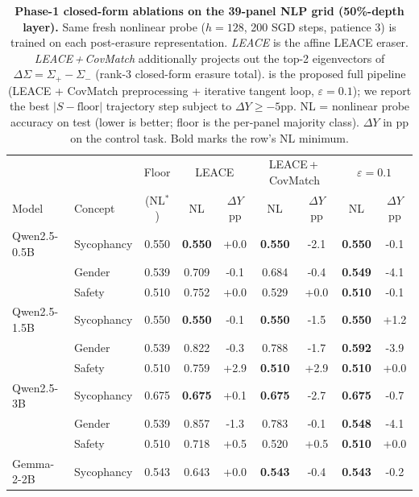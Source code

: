\begin{table}[t]
\centering
\small
\caption{\textbf{Phase-1 closed-form ablations on the 39-panel NLP grid (50\%-depth layer).} Same fresh nonlinear probe ($h=128$, 200 SGD steps, patience 3) is trained on each post-erasure representation. \emph{LEACE} is the affine LEACE eraser. \emph{LEACE\,+\,CovMatch} additionally projects out the top-2 eigenvectors of $\Delta\Sigma = \Sigma_{+} - \Sigma_{-}$ (rank-3 closed-form erasure total). \emph{\TanGCEpp{}} is the proposed full pipeline (LEACE + CovMatch preprocessing + iterative tangent loop, $\varepsilon{=}0.1$); we report the best $|S{-}\text{floor}|$ trajectory step subject to $\Delta Y \geq -5$pp. NL = nonlinear probe accuracy on test (lower is better; floor is the per-panel majority class). $\Delta Y$ in pp on the control task. Bold marks the row's NL minimum.}
\label{tab:leace_vs_tangce_nlp}
\begin{tabular}{l l c | c c | c c | c c}
\toprule
 &  & Floor & \multicolumn{2}{c|}{LEACE} & \multicolumn{2}{c|}{LEACE\,+\,CovMatch} & \multicolumn{2}{c}{\TanGCEpp{} $\varepsilon{=}0.1$} \\
Model & Concept & (NL$^*$) & NL & $\Delta Y$pp & NL & $\Delta Y$pp & NL & $\Delta Y$pp \\
\midrule
Qwen2.5-0.5B & Sycophancy & 0.550 & \textbf{0.550} & +0.0 & \textbf{0.550} & -2.1 & \textbf{0.550} & -0.1 \\
 & Gender & 0.539 & 0.709 & -0.1 & 0.684 & -0.4 & \textbf{0.549} & -4.1 \\
 & Safety & 0.510 & 0.752 & +0.0 & 0.529 & +0.0 & \textbf{0.510} & -0.1 \\
\addlinespace[2pt]
Qwen2.5-1.5B & Sycophancy & 0.550 & \textbf{0.550} & -0.1 & \textbf{0.550} & -1.5 & \textbf{0.550} & +1.2 \\
 & Gender & 0.539 & 0.822 & -0.3 & 0.788 & -1.7 & \textbf{0.592} & -3.9 \\
 & Safety & 0.510 & 0.759 & +2.9 & \textbf{0.510} & +2.9 & \textbf{0.510} & +0.0 \\
\addlinespace[2pt]
Qwen2.5-3B & Sycophancy & 0.675 & \textbf{0.675} & +0.1 & \textbf{0.675} & -2.7 & \textbf{0.675} & -0.7 \\
 & Gender & 0.539 & 0.857 & -1.3 & 0.783 & -0.1 & \textbf{0.548} & -4.1 \\
 & Safety & 0.510 & 0.718 & +0.5 & 0.520 & +0.5 & \textbf{0.510} & +0.0 \\
\addlinespace[2pt]
Gemma-2-2B & Sycophancy & 0.543 & 0.643 & +0.0 & \textbf{0.543} & -0.4 & \textbf{0.543} & -0.2 \\

\end{tabular}
\end{table}
